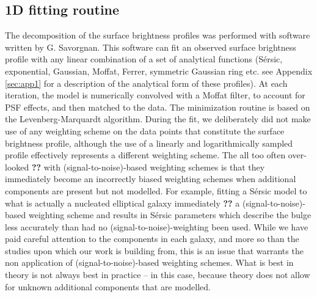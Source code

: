 \documentclass[preprint2]{emulateapj}
\begin{document}
\subsection{1D fitting routine}
The decomposition of the surface brightness profiles was performed with software written by G. Savorgnan.
This software can fit an observed surface brightness profile with any linear combination of 
a set of analytical functions (S\'ersic, exponential, Gaussian, Moffat, Ferrer, symmetric Gaussian ring etc. 
see Appendix \ref{sec:app1} for a description of the analytical form of these profiles).
At each iteration, 
the model is numerically convolved with a Moffat filter, to account for PSF effects, 
and then matched to the data.
The minimization routine is based on the Levenberg-Marquardt algorithm.
During the fit, we deliberately did not make use of any weighting scheme on the data points that constitute the 
surface brightness profile, 
although the use of a linearly and logarithmically sampled profile effectively represents a different weighting scheme.
The all too often over-looked {\bf ??} with (signal-to-noise)-based weighting schemes 
is that they immediately become an incorrectly biased weighting schemes when additional components are present but not modelled.
For example, fitting a S\'ersic model to what is actually a nucleated elliptical galaxy immediately {\bf ??} 
a (signal-to-noise)-based weighting scheme 
and results in S\'ersic parameters which describe the bulge less accurately than had no (signal-to-noise)-weighting been used.
While we have paid careful attention to the components in each galaxy, 
and more so than the studies upon which our work is building from,
this is an issue that warrants the non application of (signal-to-noise)-based weighting schemes.
What is best in theory is not always best in practice -- in this case, because theory does not allow for unknown additional components
that are modelled.
\end{document}
